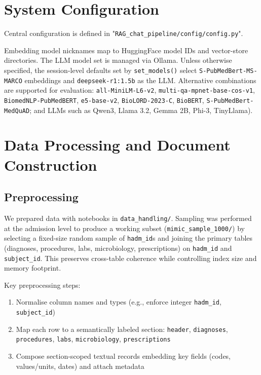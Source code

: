 \section{System Configuration}
Central configuration is defined in "\texttt{RAG\_chat\_pipeline/config/config.py}".

\noindent Embedding model nicknames map to HuggingFace model IDs and vector-store directories. The LLM model set is managed via Ollama. Unless otherwise specified, the session-level defaults set by \texttt{set\_models()} select \texttt{S-PubMedBert-MS-MARCO} embeddings and \texttt{deepseek-r1:1.5b} as the LLM. Alternative combinations are supported for evaluation: \texttt{all-MiniLM-L6-v2}, \texttt{multi-qa-mpnet-base-cos-v1}, \texttt{BiomedNLP-PubMedBERT}, \texttt{e5-base-v2}, \texttt{BioLORD-2023-C}, \texttt{BioBERT}, \texttt{S-PubMedBert-MedQuAD}; and LLMs such as Qwen3, Llama 3.2, Gemma 2B, Phi-3, TinyLlama).

\section{Data Processing and Document Construction}

\subsection{Preprocessing}
We prepared data with notebooks in \texttt{data\_handling/}. Sampling was performed at the admission level to produce a working subset (\texttt{mimic\_sample\_1000/}) by selecting a fixed-size random sample of \texttt{hadm\_id}s and joining the primary tables (diagnoses, procedures, labs, microbiology, prescriptions) on \texttt{hadm\_id} and \texttt{subject\_id}. This preserves cross-table coherence while controlling index size and memory footprint.

\noindent Key preprocessing steps:
\begin{enumerate}
  \item Normalise column names and types (e.g., enforce integer \texttt{hadm\_id}, \texttt{subject\_id})
  \item Map each row to a semantically labeled section: \texttt{header}, \texttt{diagnoses}, \texttt{procedures}, \texttt{labs}, \texttt{microbiology}, \texttt{prescriptions}
  \item Compose section-scoped textual records embedding key fields (codes, values/units, dates) and attach metadata
\end{enumerate}

